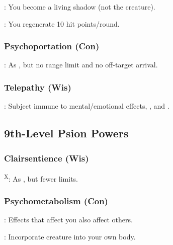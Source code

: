 : You become a living shadow (not the creature).

: You regenerate 10 hit points/round.


\subsubsection{Psychoportation (Con)}

: As , but no range limit and no off-target arrival.


\subsubsection{Telepathy (Wis)}

: Subject immune to mental/emotional effects, , and .



\subsection{9th-Level Psion Powers}


\subsubsection{Clairsentience (Wis)}

\textsuperscript{X}: As , but fewer limits.






\subsubsection{Psychometabolism (Con)}

: Effects that affect you also affect others.

: Incorporate creature into your own body.



